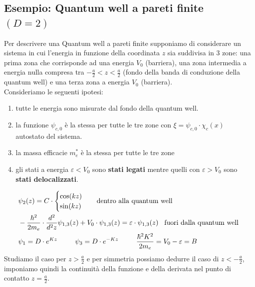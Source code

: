 \subsection{Esempio: Quantum well a pareti finite $(D=2)$}
Per descrivere una Quantum well a pareti finite supponiamo di considerare un sistema in cui l'energia in funzione della coordinata $z$ sia suddivisa in 3 zone: una prima zona che corrisponde ad una energia $V_0$ (barriera), una zona intermedia a energia nulla compresa tra $-\frac{a}{2}< z <\frac{a}{2}$ (fondo della banda di conduzione della quantum well) e una terza zona a energia $V_0$ (barriera).\\
Consideriamo le seguenti ipotesi:\\
\begin{enumerate}
    \item tutte le energia sono misurate dal fondo della quantum well.
    \item la funzione $\psi_{c,0}$ è la stessa per tutte le tre zone con $\xi = \psi_{c,0}\cdot \chi_c(x) $ autostato del sistema.
    \item la massa efficacie $m^*_e$ è la stessa per tutte le tre zone
    \item gli stati a energia $\varepsilon< V_0$ sono \textbf{stati legati} mentre quelli con $\varepsilon> V_0$ sono \textbf{stati delocalizzati}.
\end{enumerate}
\begin{equation}
    \begin{split}
        &\psi_2(z) = C \cdot \begin{cases}
            \cos(kz) \\
            \sin(kz) \end{cases}\hspace{0.3cm}\text{dentro alla quantum well}\\
        &-\frac{\hbar^2}{2m_e}\cdot \frac{d^2}{d^2z}\psi_{1,3}(z)+V_0\cdot\psi_{1,3}(z) = \varepsilon \cdot \psi_{1,3}(z) \hspace{0.3cm}\text{fuori dalla quantum well}\\
        &\psi_1 = D\cdot e^{Kz} \hspace{0.9cm} \psi_3 =D\cdot  e^{-Kz}\hspace{0.9cm}\frac{\hbar^2K^2}{2m_e}= V_0-\varepsilon =B\\
    \end{split}
\end{equation}
Studiamo il caso per $z>\frac{a}{2}$ e per simmetria possiamo dedurre il caso di $z<-\frac{a}{2}$, imponiamo quindi la continuità della funzione e della derivata nel punto di contatto $z=\frac{a}{2}$.\\
